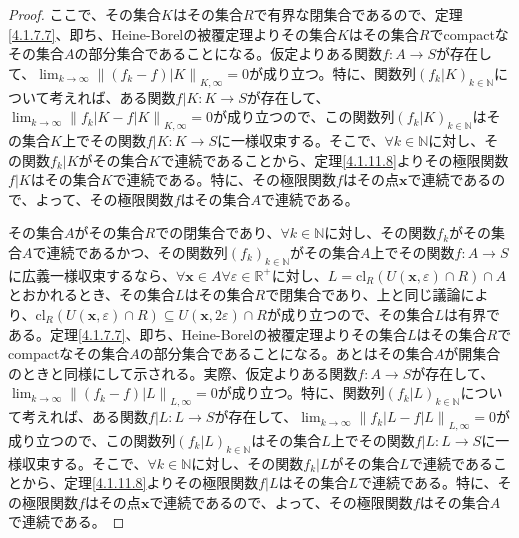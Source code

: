 \documentclass[dvipdfmx]{jsarticle}
\begin{document}
\begin{proof}
ここで、その集合$K$はその集合$R$で有界な閉集合であるので、定理\ref{4.1.7.7}、即ち、Heine-Borelの被覆定理よりその集合$K$はその集合$R$でcompactなその集合$A$の部分集合であることになる。仮定よりある関数$f:A \rightarrow S$が存在して、$\lim_{k \rightarrow \infty}\left\| \left( f_{k} - f \right)|K \right\|_{K,\infty} = 0$が成り立つ。特に、関数列$\left( f_{k}|K \right)_{k \in \mathbb{N}}$について考えれば、ある関数$f|K:K \rightarrow S$が存在して、$\lim_{k \rightarrow \infty}\left\| f_{k}|K - f|K \right\|_{K,\infty} = 0$が成り立つので、この関数列$\left( f_{k}|K \right)_{k \in \mathbb{N}}$はその集合$K$上でその関数$f|K:K \rightarrow S$に一様収束する。そこで、$\forall k \in \mathbb{N}$に対し、その関数$f_{k}|K$がその集合$K$で連続であることから、定理\ref{4.1.11.8}よりその極限関数$f|K$はその集合$K$で連続である。特に、その極限関数$f$はその点$\mathbf{x}$で連続であるので、よって、その極限関数$f$はその集合$A$で連続である。\par
その集合$A$がその集合$R$での閉集合であり、$\forall k \in \mathbb{N}$に対し、その関数$f_{k}$がその集合$A$で連続であるかつ、その関数列$\left( f_{k} \right)_{k \in \mathbb{N}}$がその集合$A$上でその関数$f:A \rightarrow S$に広義一様収束するなら、$\forall\mathbf{x} \in A\forall\varepsilon \in \mathbb{R}^{+}$に対し、$L = \mathrm{cl}_{R}\left( U\left( \mathbf{x},\varepsilon \right) \cap R \right) \cap A$とおかれるとき、その集合$L$はその集合$R$で閉集合であり、上と同じ議論により、$\mathrm{cl}_{R}\left( U\left( \mathbf{x},\varepsilon \right) \cap R \right) \subseteq U\left( \mathbf{x},2\varepsilon \right) \cap R$が成り立つので、その集合$L$は有界である。定理\ref{4.1.7.7}、即ち、Heine-Borelの被覆定理よりその集合$L$はその集合$R$でcompactなその集合$A$の部分集合であることになる。あとはその集合$A$が開集合のときと同様にして示される。実際、仮定よりある関数$f:A \rightarrow S$が存在して、$\lim_{k \rightarrow \infty}\left\| \left( f_{k} - f \right)|L \right\|_{L,\infty} = 0$が成り立つ。特に、関数列$\left( f_{k}|L \right)_{k \in \mathbb{N}}$について考えれば、ある関数$f|L:L \rightarrow S$が存在して、$\lim_{k \rightarrow \infty}\left\| f_{k}|L - f|L \right\|_{L,\infty} = 0$が成り立つので、この関数列$\left( f_{k}|L \right)_{k \in \mathbb{N}}$はその集合$L$上でその関数$f|L:L \rightarrow S$に一様収束する。そこで、$\forall k \in \mathbb{N}$に対し、その関数$f_{k}|L$がその集合$L$で連続であることから、定理\ref{4.1.11.8}よりその極限関数$f|L$はその集合$L$で連続である。特に、その極限関数$f$はその点$\mathbf{x}$で連続であるので、よって、その極限関数$f$はその集合$A$で連続である。
\end{proof}
\end{document}
